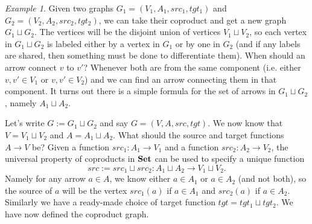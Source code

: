 \documentclass{book}
\def\to{\rightarrow}
\def\taking{\colon}
\def\Set{{\bf Set}}
\theoremstyle{remark}
\newtheorem{example}[subsubsection]{Example}
\theoremstyle{definition}
\begin{document}
\begin{example}\label{ex:coproduct of graphs}
Given two graphs $G_1=(V_1,A_1,src_1,tgt_1)$ and $G_2=(V_2,A_2,src_2,tgt_2)$, we can take their coproduct and get a new graph $G_1\sqcup G_2$. The vertices will be the disjoint union of vertices $V_1\sqcup V_2$, so each vertex in $G_1\sqcup G_2$ is labeled either by a vertex in $G_1$ or by one in $G_2$ (and if any labels are shared, then something must be done to differentiate them). When should an arrow connect $v$ to $v'$? Whenever both are from the same component (i.e. either $v,v'\in V_1$ or $v,v'\in V_2$) and we can find an arrow connecting them in that component. It turns out there is a simple formula for the set of arrows in $G_1\sqcup G_2$, namely $A_1\sqcup A_2$.

Let's write $G:=G_1\sqcup G_2$ and say $G=(V,A,src,tgt)$. We now know that $V=V_1\sqcup V_2$ and $A=A_1\sqcup A_2$. What should the source and target functions $A\to V$ be? Given a function $src_1\taking A_1\to V_1$ and a function $src_2\taking A_2\to V_2$, the universal property of coproducts in $\Set$ can be used to specify a unique function 
$$src:=src_1\sqcup src_2\taking A_1\sqcup A_2\to V_1\sqcup V_2.$$ 
Namely for any arrow $a\in A$, we know either $a\in A_1$ or $a\in A_2$ (and not both), so the source of $a$ will be the vertex $src_1(a)$ if $a\in A_1$ and $src_2(a)$ if $a\in A_2$. Similarly we have a ready-made choice of target function $tgt=tgt_1\sqcup tgt_2$. We have now defined the coproduct graph.


\end{example}
\end{document}
